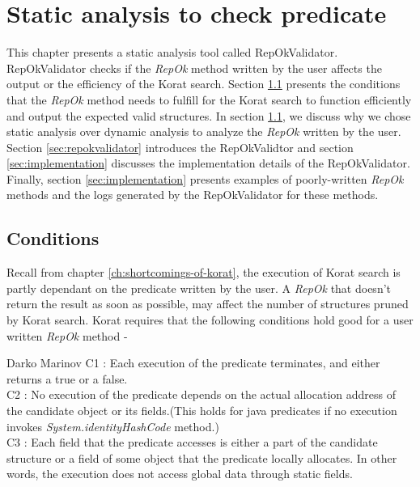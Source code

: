 \chapter{Static analysis to check predicate}
\label{ch:static-analysis}
This chapter presents a static analysis tool called
RepOkValidator. RepOkValidator checks if the \emph{RepOk} method
written by the user affects the output or the efficiency of the Korat
search. Section \ref{sec:static-analysis-conditions} presents the
conditions that the \emph{RepOk} method needs to fulfill for the
Korat search to function efficiently and output the expected valid
structures. In section \ref{sec:static-analysis-conditions}, we
discuss why we chose static analysis over dynamic analysis to analyze
the \emph{RepOk} written by the user. Section \ref{sec:repokvalidator}
introduces the RepOkValidtor and section \ref{sec:implementation}
discusses the implementation details of the RepOkValidator. Finally,
section \ref{sec:implementation} presents examples of poorly-written
\emph{RepOk} methods and the logs generated by the RepOkValidator for
these methods.


\section{Conditions}
\label{sec:static-analysis-conditions}
Recall from chapter \ref{ch:shortcomings-of-korat}, the execution of
Korat search is partly dependant on the predicate written by the
user. A \emph{RepOk} that doesn’t return the result as soon as
possible, may affect the number of structures pruned by Korat
search. Korat requires\cite{marinov2005automatic} that the following
conditions hold good for a user written \emph{RepOk} method -

\begin{aquote}{Darko Marinov}
C1 : Each execution of the predicate terminates, and either returns a
true or a false.\\ C2 : No execution of the predicate depends on the
actual allocation address of the candidate object or its fields.(This
holds for java predicates if no execution invokes
\emph{System.identityHashCode} method.)\\ C3 : Each field that the
predicate accesses is either a part of the candidate structure or a
field of some object that the predicate locally allocates. In other
words, the execution does not access global data through static
fields.\\
\end{aquote}

